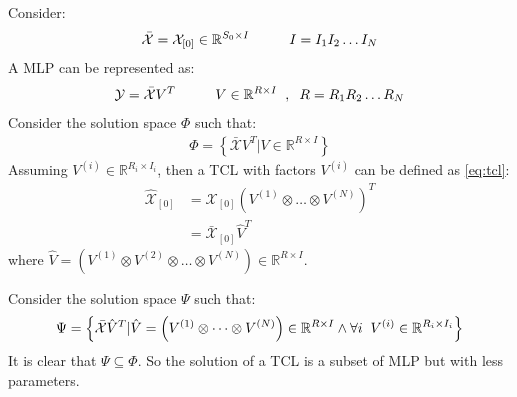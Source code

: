 \documentclass{article}
\begin{document}
Consider:
\begin{align}
	\label{eq:subspace-tcl-44}
	\bar{\mathcal{X}} = \mathcal{X}_{[0]} \in \mathbb{R}^{S_0\times I} \hspace{10mm}I=I_1I_2\dots I_N
\end{align}
A MLP can be represented as:
\begin{align}
	\label{eq:subspace-tcl-45}
	\mathcal{Y} = \bar{\mathcal{X}} V^T \hspace{10mm}V\in \mathbb{R}^{R\times I}\hspace{2mm},\hspace{2mm}R = R_1R_2\dots R_N 
\end{align}
Consider the solution space $\Phi$ such that:
\begin{align}
	\label{eq:subspace-tcl-46}
	\Phi = \left\{\bar{\mathcal{X}} V^T | V \in \mathbb{R}^{R\times I}\right\}
\end{align}
Assuming $V^{(i)} \in \mathbb{R}^{R_i\times I_i}$, then a TCL with factors $V^{(i)}$ can be defined as \ref{eq:tcl}:
\begin{align}
	\label{eq:subspace-tcl-47}
	\hat{\mathcal{X}}_{[0]} &= \mathcal{X}_{[0]} (V^{(1)}\otimes\dots\otimes V^{(N)})^T
	\nonumber\\
	&=\bar{\mathcal{X}}_{[0]} \hat{V}^T
\end{align}
where $\hat{V} = \left(V^{(1)}\otimes V^{(2)}\otimes \dots\otimes V^{(N)} \right) \in \mathbb{R}^{R\times I}$.

Consider the solution space $\Psi$ such that:
\begin{align}
	\label{eq:subspace-tcl-48}
	\Psi = \left\{\bar{\mathcal{X}} \hat{V}^T | \hat{V} =\left( V^{(1)}\otimes  \dots\otimes V^{(N)}\right)  \in \mathbb{R}^{R\times I} \land \forall i \hspace{2mm} V^{(i)} \in \mathbb{R}^{R_i\times I_i}\right\}
\end{align}
It is clear that $\Psi \subseteq \Phi$. So the solution of a TCL is a subset of  MLP but with less parameters. 
\end{document}
